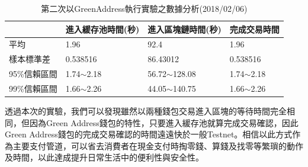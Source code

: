 				
				\begin{table}[htbp]
				\centering
				\caption{第二次以GreenAddress執行實驗之數據分析(2018/02/06)}
				\label{2green}
				\begin{tabular}{|l|l|l|l|}
				\hline
				 & 進入緩存池時間(秒) & 進入區塊鏈時間(秒) & 完成交易時間 \\ \hline
				平均 & 1.96 & 92.4 & 1.96 \\ \hline
				樣本標準差 & 0.538516 & 86.43012 & 0.538516 \\ \hline
				95\%信賴區間 & 1.74$\sim$2.18 & 56.72$\sim$128.08 & 1.74$\sim$2.18 \\ \hline
				99\%信賴區間 & 1.66$\sim$2.26 & 44.05$\sim$140.75 & 1.66$\sim$2.26 \\ \hline
				\end{tabular}
				\end{table}


	透過本次的實驗，我們可以發現雖然以兩種錢包交易進入區塊的等待時間完全相同，但因為Green Address錢包的特性，只要進入緩存池就算完成交易確認，因此Green Address錢包的完成交易確認的時間遠遠快於一般Testnet。相信以此⽅式作為主要⽀付管道，可以省去消費者在現金⽀付時掏零錢、算錢及找零等繁瑣的動作及時間，以此達成提升⽇常⽣活中的便利性與安全性。



		